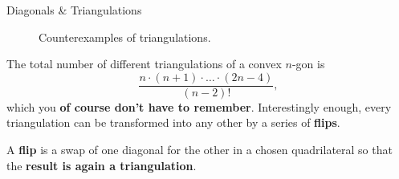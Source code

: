\documentclass[final]{beamer}
\newlength{\colwidth}
\newcommand{\bfalert}[1]{\textbf{\alert{#1}}}
\begin{document}
\begin{frame}[t]
\begin{columns}[t]
\begin{column}{\colwidth}
\begin{exampleblock}{Diagonals \& Triangulations}
\begin{figure}[H]
\begin{subfigure}[b]{.2\textwidth}
    \end{subfigure}
    \begin{subfigure}[b]{.2\textwidth}
     \centering
    \end{subfigure}
    \begin{subfigure}[b]{.2\textwidth}
     \centering
    \end{subfigure}
    \caption*{Counterexamples of \textcolor{gevored}{triangulations}.}
   \end{figure}

   The total number of different triangulations of a convex $n$-gon is
   \[
    \frac{n \cdot (n+1) \cdot \ldots \cdot (2n - 4)}{(n-2)!},
   \]
   which you \textbf{of course don't have to remember}. Interestingly enough,
   every triangulation can be transformed into any other by a series of
   \bfalert{flips}.

   A \bfalert{flip} is a swap of one diagonal for the other in a chosen
   quadrilateral so that the \textbf{result is again a triangulation}.
   \begin{figure}[H]
    \centering
    \begin{subfigure}[b]{.4\textwidth}
     \centering
\end{subfigure}
\end{figure}
\end{exampleblock}
\end{column}
\end{columns}
\end{frame}
\end{document}
